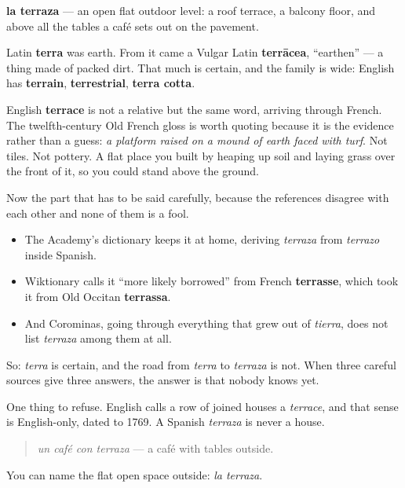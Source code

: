 \begin{cousinweb}
\textbf{la terraza} — an open flat outdoor level: a roof terrace, a balcony floor, and above all the tables a café sets out on the pavement.

Latin \textbf{terra} was earth. From it came a Vulgar Latin \textbf{terrācea}, \textquotedblleft{}earthen\textquotedblright{} — a thing made of packed dirt. That much is certain, and the family is wide: English has \textbf{terrain}, \textbf{terrestrial}, \textbf{terra cotta}.

English \textbf{terrace} is not a relative but the same word, arriving through French. The twelfth-century Old French gloss is worth quoting because it is the evidence rather than a guess: \emph{a platform raised on a mound of earth faced with turf}. Not tiles. Not pottery. A flat place you built by heaping up soil and laying grass over the front of it, so you could stand above the ground.

Now the part that has to be said carefully, because the references disagree with each other and none of them is a fool.

\begin{itemize}
\raggedright
  \item The Academy's dictionary keeps it at home, deriving \emph{terraza} from \emph{terrazo} inside Spanish.
  \item Wiktionary calls it \textquotedblleft{}more likely borrowed\textquotedblright{} from French \textbf{terrasse}, which took it from Old Occitan \textbf{terrassa}.
  \item And Corominas, going through everything that grew out of \emph{tierra}, does not list \emph{terraza} among them at all.
\end{itemize}

So: \emph{terra} is certain, and the road from \emph{terra} to \emph{terraza} is not. When three careful sources give three answers, the answer is that nobody knows yet.

One thing to refuse. English calls a row of joined houses a \emph{terrace}, and that sense is English-only, dated to 1769. A Spanish \emph{terraza} is never a house.

\begin{quote}
\emph{un café con terraza} — a café with tables outside.
\end{quote}
\end{cousinweb}

\begin{grammarlens}[title={What you've built}]
You can name the flat open space outside: \emph{la terraza}.
\end{grammarlens}

